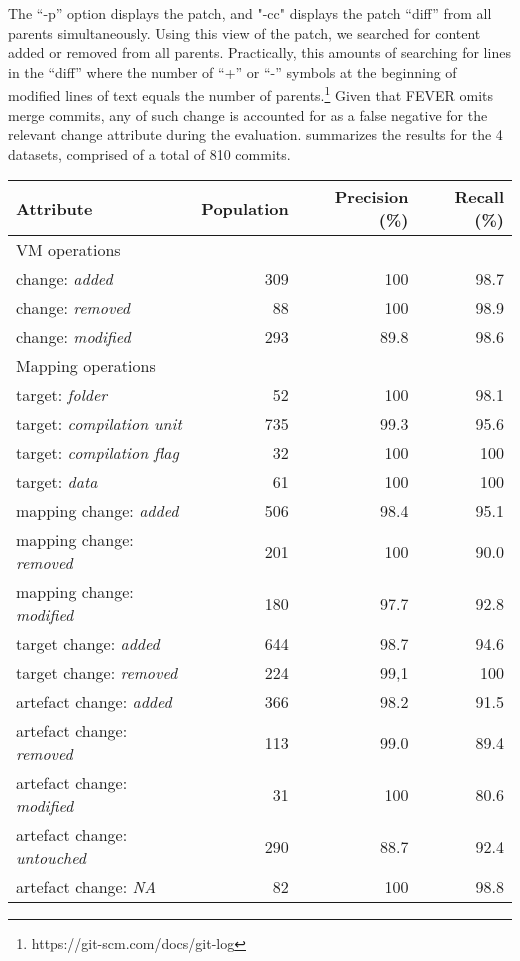 The ``-p'' option displays the patch, and "-cc" displays the patch ``diff'' from all parents simultaneously.
Using this view of the patch, we searched for content added or removed from all parents. 
Practically, this amounts of searching for lines in the ``diff'' where the number of ``+'' or ``-'' symbols
at the beginning of modified lines of text equals the number of parents.\footnote{https://git-scm.com/docs/git-log}
Given that FEVER omits merge commits, any of such change is accounted for as a false negative for the relevant change attribute
during the evaluation.
 summarizes the results for the 4 datasets, comprised of a total of 810 commits.

\begin{table}[t]
\centering
\small
{
\begin{tabular}{|l|r|r|r|}
\hline
Attribute & Population & Precision (\%) & Recall (\%) \\
\hline
VM operations 							&  &  &   				\\
change: \textit{added} 					&  309 & 100  & 98.7		\\
change: \textit{removed}					&  88  & 100  & 98.9 	\\
change: \textit{modified}				&  293 & 89.8 & 98.6		\\
\hline
Mapping operations						&  &  & 					\\
target: \textit{folder}					& 52  & 100 & 98.1		\\
target: \textit{compilation unit}		& 735 & 99.3 & 95.6 		\\
target: \textit{compilation flag}		& 32  & 100 & 100 		\\
target: \textit{data}					& 61  & 100 & 100 		\\
mapping change: \textit{added}	    		& 506 & 98.4  & 95.1 	\\
mapping change: \textit{removed}  		& 201 & 100 & 90.0 		\\
mapping change: \textit{modified} 		& 180 & 97.7  & 92.8		\\
target change: \textit{added}			& 644 & 98.7  & 94.6		\\
target change: \textit{removed}			& 224 & 99,1 & 100		\\
artefact change: \textit{added}	    		& 366 & 98.2  & 91.5		\\
artefact change: \textit{removed}  		& 113 & 99.0 & 89.4		\\
artefact change: \textit{modified} 		& 31 & 100  & 80.6		\\
artefact change: \textit{untouched}   	& 290 & 88.7  & 92.4		\\
artefact change: \textit{NA}   			& 82 & 100  & 98.8		\\


\end{tabular}}
\end{table}

